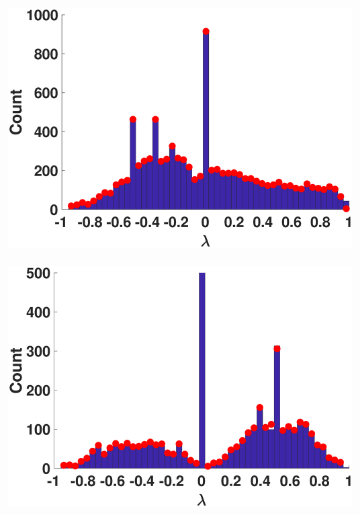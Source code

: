 \begin{figure}[htp]
\begin{subfigure}[t]{0.19\textwidth}
    \includegraphics[width=\textwidth,trim = .4cm 0.5cm 3.5cm 1.3cm,clip]
    {./ndos/pics/hepth}
    \label{fig:hepth_dos}
  \end{subfigure}
  \begin{subfigure}[t]{0.19\textwidth}
    \centering  
    \captionsetup{justification=centering,font=scriptsize}
    \includegraphics[width=\textwidth,trim = .4cm 0.5cm 3.5cm 1.3cm,clip]
    {./ndos/pics/as20000102}
    \label{fig:as2_dos}
  \end{subfigure}
  \begin{subfigure}[t]{0.19\textwidth}
    \centering
    \captionsetup{justification=centering,font=scriptsize}

\end{subfigure}
\end{figure}
